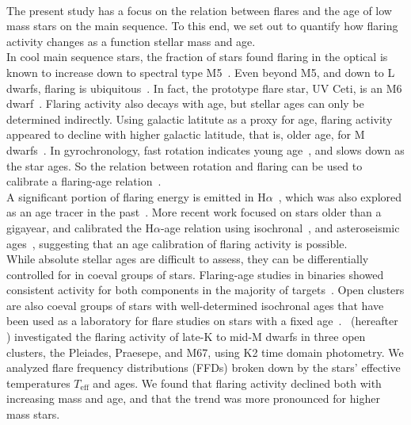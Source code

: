 \documentclass{aa}
\begin{document}
\\
The present study has a focus on the relation between flares and the age of low mass stars on the main sequence. To this end, we set out to quantify how flaring activity changes as a function stellar mass and age. 
\\
In cool main sequence stars, the fraction of stars found flaring in the optical is known to increase down to spectral type M5~\citep{yang_flaring_2017, chang2020}. Even beyond M5, and down to L dwarfs, flaring is ubiquitous~\citep{stelzer2006, robrade2010, gizis2013, schmidt2015, schmidt2016, paudel2018}. In fact, the prototype flare star, UV Ceti, is an M6 dwarf~\citep{kirkpatrick1991}. %
Flaring activity also decays with age, but stellar ages can only be determined indirectly. Using galactic latitute as a proxy for age, flaring activity appeared to decline with higher galactic latitude, that is, older age, for M dwarfs~\citep{hilton2010, walkowicz2011, howard2019}. In gyrochronology, fast rotation indicates young age~\citep{barnes_rotational_2003}, and slows down as the star ages. So the relation between rotation and flaring can be used to calibrate a flaring-age relation~\citep{davenport2019}. 
\\
A significant portion of flaring energy is emitted in H$\alpha$~\citep{kowalski2013}, 
which was also explored as an age tracer in the past~\citep{soderblom_chromospheric_1991, pace_chromospheric_2013, lorenzo-oliveira_age-mass-metallicity-activity_2016}. More recent work focused on stars older than a gigayear, and calibrated the H$\alpha$-age relation using isochronal~\citep{lorenzooliveira2018}, and asteroseismic ages~\citep{booth2017, booth2020}, suggesting that an age calibration of flaring activity is possible. %
\\
While absolute stellar ages are difficult to assess, they can be differentially controlled for in coeval groups of stars. Flaring-age studies in binaries showed consistent activity for both components in the majority of targets~\citep{lurie2015, clarke_flare_2018}. Open clusters are also coeval groups of stars with well-determined isochronal ages that have been used as a laboratory for flare studies on stars with a fixed age~\citep{mirzoyan1993, chang2015}. \citet{ilin2019}~(hereafter ) investigated the flaring activity of late-K to mid-M dwarfs in three open clusters, the Pleiades, Praesepe, and M67, using K2 time domain photometry. We analyzed flare frequency distributions (FFDs) broken down by the stars' effective temperatures $T_\mathrm{eff}$ and ages. We found that flaring activity declined both with increasing mass and age, and that the trend was more pronounced for higher mass stars. 
\end{document}
